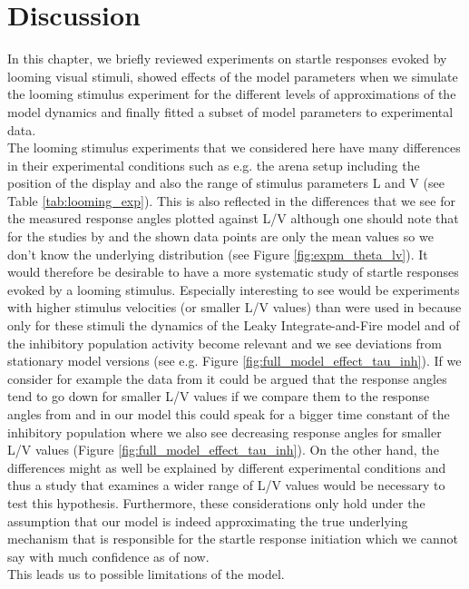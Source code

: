 \documentclass[a4paper,10pt,hidelinks]{scrreprt}
\begin{document}
    \section{Discussion}
    In this chapter, we briefly reviewed experiments on startle responses evoked by looming visual stimuli, showed effects of the model parameters when we simulate the looming stimulus experiment for the different levels of approximations of the model dynamics and finally fitted a subset of model parameters to experimental data.\\
    The looming stimulus experiments that we considered here have many differences in their experimental conditions such as e.g. the arena setup including the position of the display and also the range of stimulus parameters L and V (see Table \ref{tab:looming_exp}).
    This is also reflected in the differences that we see for the measured response angles plotted against L/V although one should note that for the studies by \cite{Dunn2016} and \cite{Preuss2006} the shown data points are only the mean values so we don't know the underlying distribution (see Figure \ref{fig:expm_theta_lv}).
    It would therefore be desirable to have a more systematic study of startle responses evoked by a looming stimulus.
    Especially interesting to see would be experiments with higher stimulus velocities (or smaller L/V values) than were used in \cite{Bhattacharyya2017} because only for these stimuli the dynamics of the Leaky Integrate-and-Fire model and of the inhibitory population activity become relevant and we see deviations from stationary model versions (see e.g. Figure \ref{fig:full_model_effect_tau_inh}).
    If we consider for example the data from \cite{Temizer2015} it could be argued that the response angles tend to go down for smaller L/V values if we compare them to the response angles from \cite{Bhattacharyya2017} and in our model this could speak for a bigger time constant of the inhibitory population where we also see decreasing response angles for smaller L/V values (Figure \ref{fig:full_model_effect_tau_inh}).
    On the other hand, the differences might as well be explained by different experimental conditions and thus a study that examines a wider range of L/V values would be necessary to test this hypothesis.
    Furthermore, these considerations only hold under the assumption that our model is indeed approximating the true underlying mechanism that is responsible for the startle response initiation which we cannot say with much confidence as of now.\\
    This leads us to possible limitations of the model.
\end{document}
